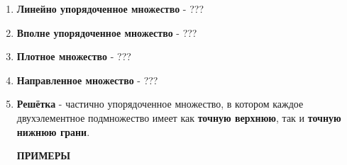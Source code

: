 \documentclass{book}
\begin{document}
\begin{enumerate}[label=\arabic*., parsep=4pt, itemsep=4pt, topsep=4pt, partopsep=0pt]
\begin{enumerate}[label=\arabic*., parsep=4pt, itemsep=4pt, topsep=4pt, partopsep=0pt]
\begin{enumerate}[label=\arabic*., parsep=4pt, itemsep=4pt, topsep=4pt, partopsep=0pt]
\item \textit{«Является конгруэнтным (сравнимым) по модулю n».} На множестве $\mathbb{Z}$ целых чисел отношение «является конгруэнтным (сравнимым) по модулю n» рефлексивно, потому что каждое целое число конгруэнтно самому себе по модулю любого целого числа n.

Пусть $n \in \mathbb{Z}, n \neq 0$.\\
Отношение конгруэнтности по модулю n обозначим как $a \equiv b(mod\text{ }n)$.

Рефлексивность этого отношения выражается так:

$R_n = \{(a, b) \in \mathbb{Z} \times \mathbb{Z} \mid a \equiv b \pmod{n}\}$\\
$a \equiv a \pmod{n} = true \Leftrightarrow 0 = n \cdot 0 = true$, стало быть, отношение $R_n$ рефлексивно.

Используя определение конгруэнтности через делимость, можно записать это полностью на языке арифметики:

$R_n = \{(a−a=k \cdot n) \forall a \in \mathbb{Z} \times \mathbb{Z} \exists k \in \mathbb{Z}\} , a−a=0$ , а $0=0 \cdot n = true$, стало быть отношение $R_n$, опять же, рефлексивно.

\end{enumerate}

\item \textbf{Антисимметричность:}

\item \textbf{Транзитивность:}

\end{enumerate}

\item \textbf{Линейно упорядоченное множество} - ???

\item \textbf{Вполне упорядоченное множество} - ???

\item \textbf{Плотное множество} - ???

\item \textbf{Направленное множество} - ???

\item \textbf{Решётка} - частично упорядоченное множество, в котором каждое двухэлементное подмножество имеет как \textbf{точную верхнюю}, так и \textbf{точную нижнюю грани}.

\textbf{ПРИМЕРЫ}

\end{enumerate}
\end{document}
